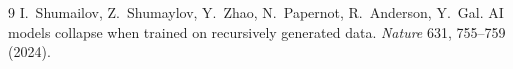 \documentclass[10pt]{article}
\begin{document}
{\footnotesize
\begin{thebibliography}{9}\setlength{\itemsep}{1pt}
 I.~Shumailov, Z.~Shumaylov, Y.~Zhao, N.~Papernot, R.~Anderson, Y.~Gal. AI models collapse when trained on recursively generated data. \emph{Nature} 631, 755--759 (2024).
\end{thebibliography}}
\end{document}
